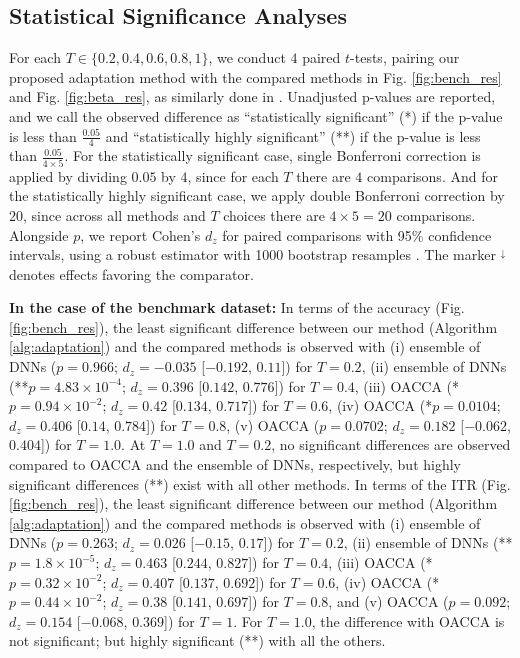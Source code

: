 \documentclass[12pt]{iopart}
\begin{document}
\subsection{Statistical Significance Analyses}\label{sec:statistic_analysis}
{For each $T\in \{0.2, 0.4, 0.6, 0.8, 1\}$, we conduct $4$ paired $t$-tests, pairing our proposed adaptation method with the compared methods in Fig. \ref{fig:bench_res} and Fig. \ref{fig:beta_res}, as similarly done in \cite{ournetwork, our_ensemble}. Unadjusted p-values are reported, and we call the observed difference as ``statistically significant'' (*) if the p-value is less than $\frac{0.05}{4}$ and ``statistically highly significant'' (**) if the p-value is less than $\frac{0.05}{4\times 5}$. For the statistically significant case, single Bonferroni correction is applied by dividing $0.05$ by $4$, since for each $T$ there are $4$ comparisons. And for the statistically highly significant case, we apply double Bonferroni correction by $20$, since across all methods and $T$ choices there are $4\times5=20$ comparisons. Alongside $p$, we report Cohen’s $d_z$ for paired comparisons with 95\% confidence intervals, using a robust estimator with 1000 bootstrap resamples \cite{robust_cohen}. The marker $^{\downarrow}$ denotes effects favoring the comparator.


\textbf{In the case of the benchmark dataset:} In terms of the accuracy (Fig. \ref{fig:bench_res}), the least significant difference between our method (Algorithm \ref{alg:adaptation}) and the compared methods is observed with (i) ensemble of DNNs ($p=0.966$; $d_z=-0.035$ [$-0.192$, $0.11 $]) for $T=0.2$, (ii) ensemble of DNNs (**$p=4.83 \times 10^{-4}$; $d_z=0.396$ [$0.142$, $0.776 $]) for $T=0.4$, (iii) OACCA (*$p=0.94 \times 10^{-2}$; $d_z=0.42$ [$0.134$, $0.717 $]) for $T=0.6$, (iv) OACCA (*$p=0.0104$; $d_z=0.406$ [$0.14$, $0.784 $]) for $T=0.8$, (v) OACCA ($p=0.0702$; $d_z=0.182$ [$-0.062$, $0.404 $]) for $T=1.0$. At $T=1.0$ and $T=0.2$, no significant differences are observed compared to OACCA and the ensemble of DNNs, respectively, but highly significant differences (**) exist with all other methods. In terms of the ITR (Fig. \ref{fig:bench_res}), the least significant difference between our method (Algorithm \ref{alg:adaptation}) and the compared methods is observed with (i) ensemble of DNNs ($p=0.263$; $d_z=0.026$ [$-0.15$, $0.17 $]) for $T=0.2$, (ii) ensemble of DNNs (**$p=1.8 \times 10^{-5}$; $d_z=0.463$ [$0.244$, $0.827 $]) for $T=0.4$, (iii) OACCA (*$p=0.32 \times 10^{-2}$; $d_z=0.407$ [$0.137$, $0.692 $]) for $T=0.6$, (iv) OACCA (*$p=0.44 \times 10^{-2}$; $d_z=0.38$ [$0.141$, $0.697 $]) for $T=0.8$, and (v) OACCA ($p=0.092$; $d_z=0.154$ [$-0.068$, $0.369 $]) for $T=1$. For $T=1.0$, the difference with OACCA is not significant; but highly significant (**) with all the others.

}
\end{document}
